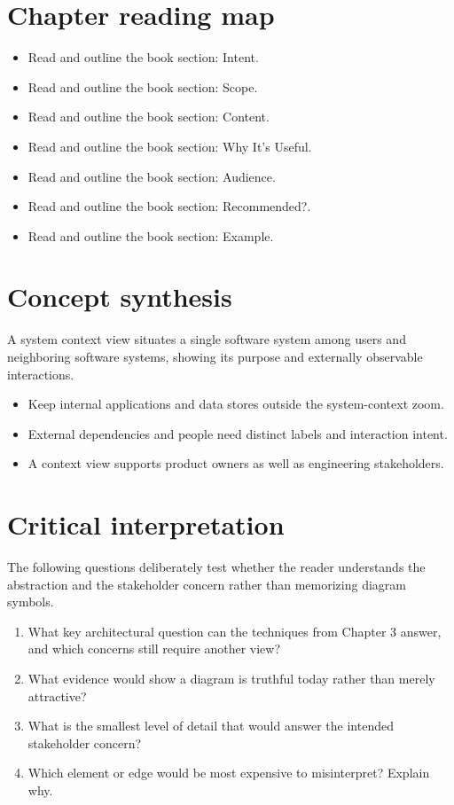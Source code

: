 \documentclass[10pt,letterpaper]{article}
\begin{document}
\section{Chapter reading map}
\begin{itemize}
\item Read and outline the book section: Intent.
\item Read and outline the book section: Scope.
\item Read and outline the book section: Content.
\item Read and outline the book section: Why It’s Useful.
\item Read and outline the book section: Audience.
\item Read and outline the book section: Recommended?.
\item Read and outline the book section: Example.
\end{itemize}

\section{Concept synthesis}
A system context view situates a single software system among users and neighboring software systems, showing its purpose and externally observable interactions.

\begin{itemize}
\item Keep internal applications and data stores outside the system-context zoom.
\item External dependencies and people need distinct labels and interaction intent.
\item A context view supports product owners as well as engineering stakeholders.
\end{itemize}

\section{Critical interpretation}
The following questions deliberately test whether the reader understands the abstraction and the stakeholder concern rather than memorizing diagram symbols.

\begin{enumerate}
\item What key architectural question can the techniques from Chapter 3 answer, and which concerns still require another view?
\item What evidence would show a diagram is truthful today rather than merely attractive?
\item What is the smallest level of detail that would answer the intended stakeholder concern?
\item Which element or edge would be most expensive to misinterpret? Explain why.
\end{enumerate}
\end{document}

